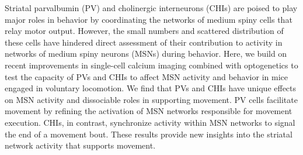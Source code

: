 Striatal parvalbumin (PV) and cholinergic interneurons (CHIs) are poised to play major roles in behavior by coordinating the networks of medium spiny cells that relay motor output. However, the small numbers and scattered distribution of these cells have hindered direct assessment of their contribution to activity in networks of medium spiny neurons (MSNs) during behavior. Here, we build on recent improvements in single-cell calcium imaging combined with optogenetics to test the capacity of PVs and CHIs to affect MSN activity and behavior in mice engaged in voluntary locomotion. We find that PVs and CHIs have unique effects on MSN activity and dissociable roles in supporting movement. PV cells facilitate movement by refining the activation of MSN networks responsible for movement execution. CHIs, in contrast, synchronize activity within MSN networks to signal the end of a movement bout. These results provide new insights into the striatal network activity that supports movement.
